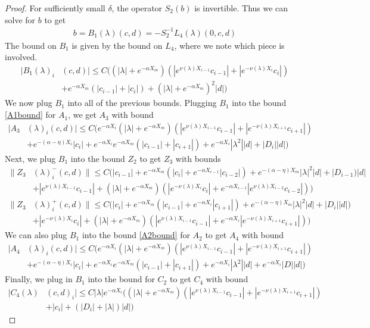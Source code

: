 \documentclass[thesis.tex]{subfiles}
\begin{document}
\begin{lemma}
\begin{proof}
For sufficiently small $\delta$, the operator $S_2(b)$ is invertible. Thus we can solve for $b$ to get
\begin{align}
b = B_1(\lambda)(c,d) 
= -S_2^{-1} L_4(\lambda)(0, c, d)
\end{align}
The bound on $B_1$ is given by the bound on $L_4$, where we note which piece is involved.
\begin{align*}
|B_1(\lambda)_i&(c, d)| \leq C \Big( (|\lambda| + e^{-\alpha X_m})(|e^{\nu(\lambda)X_{i-1}} c_{i-1}| + |e^{-\nu(\lambda)X_i} c_i|) \\
&+ e^{-\alpha X_m}(|c_{i-1}| + |c_i|) + (|\lambda| + e^{-\alpha X_m})^2 |d|  \Big)
\end{align*}
We now plug $B_1$ into all of the previous bounds. Plugging $B_1$ into the bound \eqref{A1bound} for $A_1$, we get $A_3$ with bound
\begin{align*}
|A_3&(\lambda)_i(c, d)|
\leq C \Big(  
e^{-\alpha X_i} (|\lambda| + e^{-\alpha X_m})(|e^{\nu(\lambda)X_{i-1}} c_{i-1}| + |e^{-\nu(\lambda)X_{i+1}}c_{i+1}|) \\
&+ e^{-(\alpha - \eta)X_i}|c_i| + e^{-\alpha X_i} e^{-\alpha X_m}(|c_{i-1}| + |c_{i+1}|) + e^{-\alpha X_i} |\lambda^2||d| + |D_i||d| \Big)
\end{align*} 
Next, we plug $B_1$ into the bound $Z_2$ to get $Z_3$ with bounds
\begin{align*}
\| Z_3&(\lambda)_i^-(c,d) \| \leq C\Big(|c_{i-1}| + e^{-\alpha X_m}(|c_i| + e^{-\alpha X_{i-1}} |c_{i-2}|) + e^{-(\alpha - \eta) X_m}|\lambda|^2|d| + |D_{i-1})|d| \\
&+ |e^{\nu(\lambda)X_{i-1}}c_{i-1}| + (|\lambda| + e^{-\alpha X_m})(|e^{-\nu(\lambda)X_i} c_i| + e^{-\alpha X_{i-1}} |e^{\nu(\lambda)X_{i-2}} c_{i-2}|)\Big) \\
\| Z_3&(\lambda)_i^+(c,d) \| \leq C\Big(|c_i| + e^{-\alpha X_m}(|c_{i-1}| + e^{-\alpha X_i} |c_{i+1}|) + e^{-(\alpha - \eta) X_m}|\lambda|^2|d| + |D_i||d|) \\
&+ |e^{-\nu(\lambda)X_i} c_i| + (|\lambda| + e^{-\alpha X_m})(|e^{\nu(\lambda)X_{i-1}} c_{i-1}| + e^{-\alpha X_i} |e^{-\nu(\lambda)X_{i+1}} c_{i+1}|)\Big)
\end{align*}
We can also plug $B_1$ into the bound \eqref{A2bound} for $A_2$ to get $A_4$ with bound
\begin{align*}
|A_4&(\lambda)_i(c, d)|
\leq C \Big(  
e^{-\alpha X_i} (|\lambda| + e^{-\alpha X_m})(|e^{\nu(\lambda)X_{i-1}} c_{i-1}| + |e^{-\nu(\lambda)X_{i+1}}c_{i+1}|) \\
&+ e^{-(\alpha - \eta)X_i}|c_i| + e^{-\alpha X_i} e^{-\alpha X_m}(|c_{i-1}| + |c_{i+1}|) + e^{-\alpha X_i} |\lambda^2||d| + e^{-\alpha X_i}|D||d| \Big)
\end{align*} 
Finally, we plug in $B_1$ into the bound for $C_2$ to get $C_4$ with bound
\begin{align*}
|C_4(\lambda)&(c, d)_i| \leq C |\lambda| e^{-\alpha X_i} \Big( (|\lambda| + e^{-\alpha X_m})(|e^{\nu(\lambda)X_{i-1}} c_{i-1}| + |e^{-\nu(\lambda)X_{i+1}}c_{i+1}|)\\
&+ |c_i| + (|D_i| + |\lambda|)|d| \Big)
\end{align*} 


\end{proof}
\end{lemma}
\end{document}
